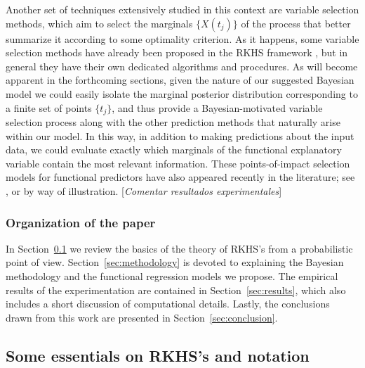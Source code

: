 \documentclass[ba]{imsart}
\numberwithin{equation}{section}
\theoremstyle{plain}
\newcommand\incomment[2][comment-red]{\color{#1}[\textit{#2}]\color{black}}
\begin{document}
Another set of techniques extensively studied in this context are variable selection methods, which aim to select the marginals \(\{X(t_j)\}\) of the process that better summarize it according to some optimality criterion. As it happens, some variable selection methods have already been proposed in the RKHS framework \citep[see for example][]{berrendero2019rkhs}, but in general they have their own dedicated algorithms and procedures. As will become apparent in the forthcoming sections, given the nature of our suggested Bayesian model we could easily isolate the marginal posterior distribution corresponding to a finite set of points \(\{t_j\}\), and thus provide a Bayesian-motivated variable selection process along with the other prediction methods that naturally arise within our model. In this way, in addition to making predictions about the input data, we could evaluate exactly which marginals of the functional explanatory variable contain the most relevant information. These points-of-impact selection models for functional predictors have also appeared recently in the literature; see \citet{poss2020superconsistent}, \citet{berrendero2016variable} or \citet{ferraty2010most} by way of illustration. \incomment{Comentar resultados experimentales}


\subsubsection{Organization of the paper}

In Section~\ref{sec:rkhs} we review the basics of the theory of RKHS's from a probabilistic point of view. Section~\ref{sec:methodology} is devoted to explaining the Bayesian methodology and the functional regression models we propose. The empirical results of the experimentation are contained in Section~\ref{sec:results}, which also includes a short discussion of computational details. Lastly, the conclusions drawn from this work are presented in Section~\ref{sec:conclusion}.

\subsection{Some essentials on RKHS's and notation}\label{sec:rkhs}
\end{document}
